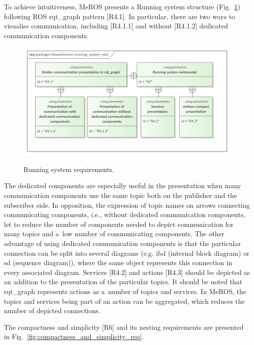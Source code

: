 To achieve intuitiveness, MeROS presents a Running system structure (Fig.~\ref{fig:running_system_req}) following ROS rqt\_graph pattern [R4.1]. In particular, there are two ways to visualise communication, including [R4.1.1] and without [R4.1.2]
dedicated communication components.
\begin{figure}[H]
	\centering
	\begin{center}
	{\includegraphics[scale=0.9]{../imgs/requirement_pkg/running_system_req.png}}
	\end{center}
	\caption{Running system requirements.}
	\label{fig:running_system_req}
\end{figure}
The dedicated components are especially useful in the presentation when many communication components use the same topic both on the publisher and the subscriber side. In opposition, the expression of topic names on arrows connecting communicating components, i.e., without dedicated communication components, let to reduce the number of components needed to depict communication for many topics and a~low number of communicating components. The other advantage of using dedicated communication components is that the particular connection can be split into several diagrams (e.g. ibd (internal block diagram) or sd (sequence diagram)), where the same object represents this connection in every associated diagram. Services [R4.2] and actions [R4.3] should be depicted as an addition to the presentation of the particular topics. It should be noted that rqt\_graph represents actions as a~number of topics and services. In MeROS, the topics and services being part of an action can be aggregated, which reduces the number of depicted connections.


The compactness and simplicity [R6] and its nesting requirements are presented in Fig.~\ref{fig:compactness_and_simplicity_req}.

